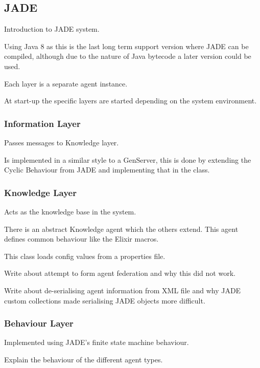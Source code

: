 \subsection{JADE}

Introduction to JADE system.

Using Java 8 as this is the last long term support version where JADE can be compiled, although due to the nature of Java bytecode a later version could be used.

Each layer is a separate agent instance.

At start-up the specific layers are started depending on the system environment.

\subsubsection{Information Layer}

Passes messages to Knowledge layer.

Is implemented in a similar style to a GenServer, this is done by extending the Cyclic Behaviour from JADE and implementing that in the class.

\subsubsection{Knowledge Layer}

Acts as the knowledge base in the system.

There is an abstract Knowledge agent which the others extend.
This agent defines common behaviour like the Elixir macros.

This class loads config values from a properties file.

Write about attempt to form agent federation and why this did not work.

Write about de-serialising agent information from XML file and why JADE custom collections made serialising JADE objects more difficult.

\subsubsection{Behaviour Layer}

Implemented using JADE's finite state machine behaviour.

Explain the behaviour of the different agent types.
